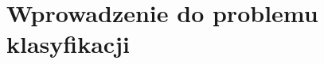 \documentclass[../thesis.tex]{subfiles}
\begin{document}
\pagestyle{plain}
\chapter{Wprowadzenie do problemu klasyfikacji}
\end{document}
